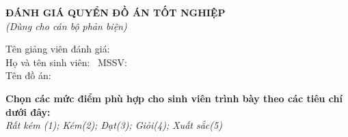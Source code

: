 \thispagestyle{empty}
\begin{center}
    \textbf{\fontsize{14pt}{16pt}\selectfont ĐÁNH GIÁ QUYỂN ĐỒ ÁN TỐT NGHIỆP}\\
    \textit{\fontsize{12pt}{14pt}\selectfont (Dùng cho cán bộ phản biện)}
\end{center}

\vspace{10pt}
\noindent Tên giảng viên đánh giá: \dotfill \\
Họ và tên sinh viên: \dotfill\ MSSV: \makebox[2.5cm]{\dotfill} \\
Tên đồ án: \dotfill \\
\makebox[\textwidth]{\dotfill}

\vspace{10pt}
\noindent \textbf{Chọn các mức điểm phù hợp cho sinh viên trình bày theo các tiêu chí dưới đây:}\\
\textit{Rất kém (1); Kém(2); Đạt(3); Giỏi(4); Xuất sắc(5)}

